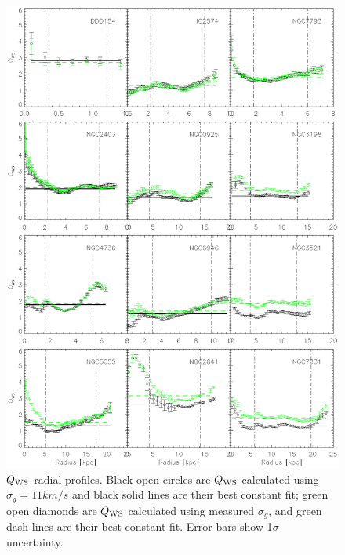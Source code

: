 \documentclass[12pt,preprint]{aastex}
\begin{document}
\begin{figure}
\begin{center}
\includegraphics[scale=0.8]{QwithError.eps}  \caption{$Q_{\rm WS}$ radial profiles.  Black open circles  are  $Q_{\rm WS}$ calculated using $\sigma_g=11km/s$ and black solid lines are their best constant fit; green open diamonds are $Q_{\rm WS}$ calculated using measured $\sigma_g$, and green dash lines are their best  constant fit. Error bars show 1$\sigma$ uncertainty.}
\label{q_vsig}
\end{center}
\end{figure}
\end{document}
